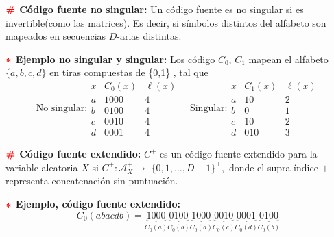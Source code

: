 \documentclass[%
 reprint,
 amsmath,amssymb,
 aps,
]{revtex4-1}
\begin{document}
\textbf{$\color{red}{\textbf{\#}}$ Código fuente no singular:} 
Un código fuente es no singular si es invertible(como las matrices). Es decir, si símbolos distintos del alfabeto son mapeados en secuencias $D$-arias distintas.

\textbf{$\textcolor{red}{\color{red}{\boldsymbol{*}}}$ Ejemplo no singular y singular:}
Los código $C_{0}$, $C_{1}$ mapean el alfabeto $\{a, b, c, d\}$ en tiras compuestas de \{0,1\} , tal que
$$
\text{No singular:}
\begin{array}{c|c|c}
x & C_{0}(x) & \ell(x) \\
\hline a & 1000 & 4 \\
b & 0100 & 4 \\
c & 0010 & 4 \\
d & 0001 & 4
\end{array}\quad 
\text{Singular:}
\begin{array}{c|c|c}
x & C_{1}(x) & \ell(x) \\
\hline a & 10 & 2 \\
b & 0 & 1 \\
c & 10 & 2 \\
d & 010 & 3
\end{array}
$$

\textbf{$\color{red}{\textbf{\#}}$ Código fuente extendido:} 
$C^{+}$ es un código fuente extendido para la variable aleatoria $X$ si $C^{+}: \mathcal{A}_{X}^{+} \rightarrow$ $\{0,1, \ldots, D-1\}^{+},$ donde el supra-índice $+$ representa concatenación sin puntuación.

\textbf{$\textcolor{red}{\color{red}{\boldsymbol{*}}}$ Ejemplo, código fuente extendido:} 
$$
C_{0}(a b a c d b)=\underbrace{1000}_{C_{0}(a)} \underbrace{0100}_{C_{0}(b)} \underbrace{1000}_{C_{0}(a)} \underbrace{0010}_{C_{0}(c)} \underbrace{0001}_{C_{0}(d)} \underbrace{0100}_{C_{0}(b)}
$$
\end{document}
